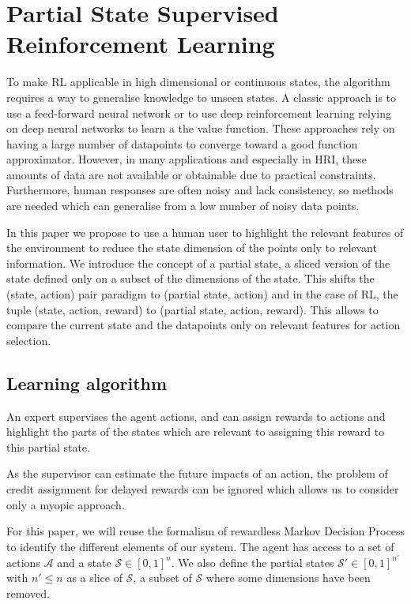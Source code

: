 \documentclass[letterpaper]{article} %
\begin{document}
\section{Partial State Supervised Reinforcement Learning}

To make RL applicable in high dimensional or continuous states, the algorithm
requires a way to generalise knowledge to unseen states. A classic approach is
to use a feed-forward neural network or to use deep reinforcement learning
relying on deep neural networks to learn a the value function. These approaches
rely on having a large number of datapoints to converge toward a good function
approximator. However, in many applications and especially in HRI, these amounts
of data are not available or obtainable due to practical constraints.
Furthermore, human responses are often noisy and lack consistency, so methods
are needed which can generalise from a low number of noisy data points.

In this paper we propose to use a human user to highlight the relevant features
of the environment to reduce the state dimension of the points only to relevant
information.  We introduce the concept of a partial state, a sliced version of
the state defined only on a subset of the dimensions of the state. This shifts
the (state, action) pair paradigm to (partial state, action)  and in the case of
RL, the tuple (state, action, reward) to (partial state, action, reward). This
allows to compare the current state and the datapoints only on relevant features
for action selection.

\subsection{Learning algorithm}

An expert supervises the agent actions, and can assign rewards to actions and
highlight the parts of the states which are relevant to assigning this reward to
this partial state.

As the supervisor can estimate the future impacts of an action, the problem of
credit assignment for delayed rewards can be ignored which allows us to consider
only a myopic approach. 

For this paper, we will reuse the formalism of rewardless Markov Decision
Process to identify the different elements of our system. The agent has access
to a set of actions $\mathcal{A}$ and a state $\mathcal{S} \in [0,1]^{n}$. We
also define the partial states $\mathcal{S'} \in [0,1]^{n'}$ with $n' \leq n$ as
a slice of $\mathcal{S}$, a subset of $\mathcal{S}$ where some dimensions have
been removed. 
\end{document}
